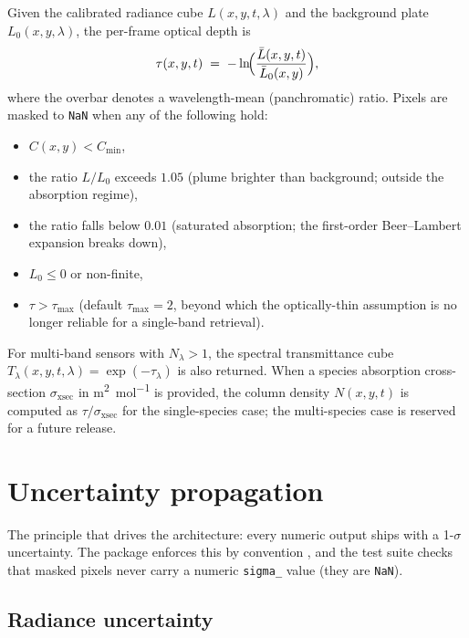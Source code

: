 \documentclass[11pt, a4paper]{article}
\begin{document}
Given the calibrated radiance cube $L(x, y, t, \lambda)$ and the
background plate $L_0(x, y, \lambda)$, the per-frame optical depth is
\begin{equation}
  \tau(x, y, t) \;=\; -\ln\!\Bigl(\frac{\bar{L}(x, y, t)}{\bar{L}_0(x, y)}\Bigr),
  \label{eq:beer-lambert}
\end{equation}
where the overbar denotes a wavelength-mean (panchromatic) ratio.
Pixels are masked to \texttt{NaN} when any of the following hold:
\begin{itemize}
  \item $C(x, y) < C_\text{min}$,
  \item the ratio $L / L_0$ exceeds $1.05$ (plume brighter than
        background; outside the absorption regime),
  \item the ratio falls below $0.01$ (saturated absorption; the
        first-order Beer--Lambert expansion breaks down),
  \item $L_0 \leq 0$ or non-finite,
  \item $\tau > \tau_\text{max}$ (default $\tau_\text{max} = 2$, beyond
        which the optically-thin assumption is no longer reliable for a
        single-band retrieval).
\end{itemize}

For multi-band sensors with $N_\lambda > 1$, the spectral transmittance
cube $T_\lambda(x, y, t, \lambda) = \exp(-\tau_\lambda)$ is also
returned. When a species absorption cross-section $\sigma_\text{xsec}$
in \si{\square\metre\per\mole} is provided, the column density
$N(x, y, t)$ is computed as $\tau / \sigma_\text{xsec}$ for the
single-species case; the multi-species case is reserved for a future
release.

\section{Uncertainty propagation}
\label{sec:uncertainty}

The principle that drives the architecture: every numeric output ships
with a 1-$\sigma$ uncertainty. The package enforces this by convention
\cite{smith2018joss}, and the test suite checks that masked pixels never
carry a numeric \texttt{sigma\_} value (they are \texttt{NaN}).

\subsection{Radiance uncertainty}
\label{sec:sigma-L}
\end{document}
